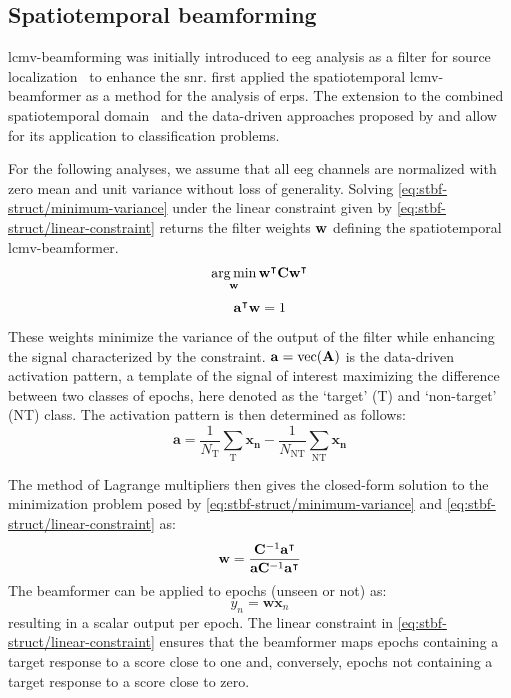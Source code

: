 	\subsection{Spatiotemporal beamforming}
  \ac{lcmv}-beamforming was initially introduced to \ac{eeg} analysis as a filter for
  source localization~\cite{VanVeen1997} to enhance the \ac{snr}.
	\textcite{VanVliet2015} first applied the spatiotemporal
	\ac{lcmv}-beamformer as a method for the analysis of \acp{erp}.
	The extension to the combined spatiotemporal domain~\cite{VanVliet2015} and the
	data-driven approaches proposed by \textcite{Treder2016} and
	\textcite{Wittevrongel2016} allow for its application to classification problems.

	For the following analyses, we assume that all \ac{eeg} channels are normalized with zero mean and unit variance without loss of generality.
	Solving \cref{eq:stbf-struct/minimum-variance} under the linear constraint given by
  \cref{eq:stbf-struct/linear-constraint} returns the filter weights $\mathbf{w}$ defining the spatiotemporal \ac{lcmv}-beamformer.
	\begin{equation}
    \operatorname*{arg\,min}_{\mathbf{w}}\mathbf{w}^\intercal \mathbf{C}
		\mathbf{w}^\intercal
		\label{eq:stbf-struct/minimum-variance}
	\end{equation}
	\begin{equation}
		\mathbf{a}^\intercal\mathbf{w} = 1
		\label{eq:stbf-struct/linear-constraint}
	\end{equation}
	These weights minimize the variance of the output of the filter while enhancing
	the signal characterized by the constraint.
  $\mathbf{a} = \operatorname{vec}(\mathbf{A})$ is the data-driven activation pattern, a template
	of the signal of interest maximizing the difference between two classes of
  epochs, here denoted as the `target' (T) and `non-target' (NT) class.
  The activation pattern is then determined as follows:
	\begin{equation}
		\mathbf{a} =
    \frac{1}{N_\mathrm{T}}\sum_\mathrm{T}\mathbf{x_n} -
    \frac{1}{N_\mathrm{NT}}\sum_\mathrm{NT}\mathbf{x_n}
		\label{eq:stbf-struct/ap}
	\end{equation}

	The method of Lagrange multipliers then gives the closed-form solution to the minimization problem posed by
	\cref{eq:stbf-struct/minimum-variance} and \cref{eq:stbf-struct/linear-constraint} as:
	\begin{equation}
		\mathbf{w} =
    \frac{\mathbf{C}^{-1}\mathbf{a}^\intercal}
    {\mathbf{a}\mathbf{C}^{-1}\mathbf{a}^\intercal}
		\label{eq:stbf-struct/closed-form}
	\end{equation}
	The beamformer can be applied to epochs (unseen or not) as:
	\begin{equation}
		y_n = \mathbf{w}\mathbf{x}_n
		\label{eq:stbf-struct/apply-bf}
	\end{equation}
	resulting in a scalar output per epoch.
	The linear constraint in \cref{eq:stbf-struct/linear-constraint} ensures that the
	beamformer maps epochs containing a target response to a score close to one
	and, conversely, epochs not containing a target response to a score close to
	zero.

